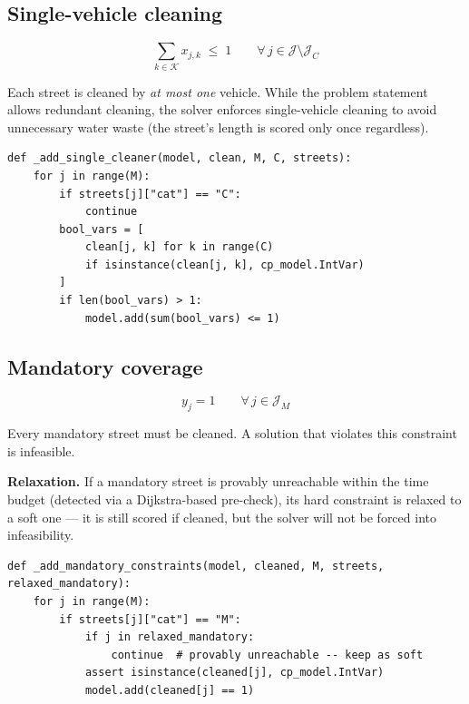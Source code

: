 \documentclass[11pt]{article}
\newcommand{\setJ}{\mathcal{J}}   %
\newcommand{\setK}{\mathcal{K}}   %
\newcommand{\Jm}{\mathcal{J}_M}   %
\newcommand{\Jc}{\mathcal{J}_C}   %
\begin{document}
\subsection{Single-vehicle cleaning}

\begin{equation}\label{eq:single}
\sum_{k \in \setK} x_{j,k} \;\le\; 1
\qquad \forall\, j \in \setJ \setminus \Jc
\end{equation}

Each street is cleaned by \emph{at most one} vehicle.  While the problem
statement allows redundant cleaning, the solver enforces single-vehicle
cleaning to avoid unnecessary water waste (the street's length is scored
only once regardless).

\begin{lstlisting}[caption={Constraint~(\ref{eq:single}): Single-vehicle cleaning}]
def _add_single_cleaner(model, clean, M, C, streets):
    for j in range(M):
        if streets[j]["cat"] == "C":
            continue
        bool_vars = [
            clean[j, k] for k in range(C)
            if isinstance(clean[j, k], cp_model.IntVar)
        ]
        if len(bool_vars) > 1:
            model.add(sum(bool_vars) <= 1)
\end{lstlisting}

\subsection{Mandatory coverage}

\begin{equation}\label{eq:mandatory}
y_j = 1
\qquad \forall\, j \in \Jm
\end{equation}

Every mandatory street must be cleaned.  A solution that violates this
constraint is infeasible.

\medskip\noindent
\textbf{Relaxation.}
If a mandatory street is provably unreachable within the time budget (detected
via a Dijkstra-based pre-check), its hard constraint is relaxed to a soft
one --- it is still scored if cleaned, but the solver will not be forced into
infeasibility.

\begin{lstlisting}[caption={Constraint~(\ref{eq:mandatory}): Mandatory coverage}]
def _add_mandatory_constraints(model, cleaned, M, streets, relaxed_mandatory):
    for j in range(M):
        if streets[j]["cat"] == "M":
            if j in relaxed_mandatory:
                continue  # provably unreachable -- keep as soft
            assert isinstance(cleaned[j], cp_model.IntVar)
            model.add(cleaned[j] == 1)
\end{lstlisting}
\end{document}
